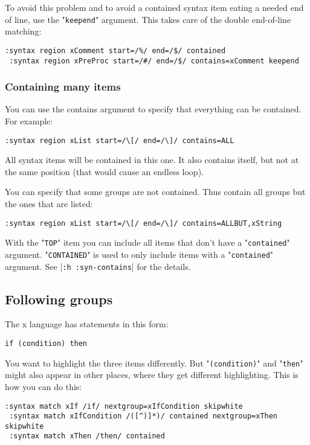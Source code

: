 To avoid this problem and to avoid a contained syntax item eating a needed end of line, use the "\texttt{keepend}" argument.
This takes care of the double end-of-line matching:

\begin{Verbatim}[samepage=true]
 :syntax region xComment start=/%/ end=/$/ contained
 :syntax region xPreProc start=/#/ end=/$/ contains=xComment keepend
\end{Verbatim}

\subsubsection{Containing many items}
You can use the contains argument to specify that everything can be contained.
For example:

\begin{Verbatim}[samepage=true]
 :syntax region xList start=/\[/ end=/\]/ contains=ALL
\end{Verbatim}

All syntax items will be contained in this one.
It also contains itself, but not at the same position (that would cause an endless loop).

You can specify that some groups are not contained.
Thus contain all groups but the ones that are listed:

\begin{Verbatim}[samepage=true]
 :syntax region xList start=/\[/ end=/\]/ contains=ALLBUT,xString
\end{Verbatim}

With the "\texttt{TOP}" item you can include all items that don't have a "\texttt{contained}" argument.
"\texttt{CONTAINED}" is used to only include items with a "\texttt{contained}" argument.
See |\texttt{:h :syn-contains}| for the details.
\subsection{Following groups}
The x language has statements in this form:

\begin{Verbatim}[samepage=true]
    if (condition) then 
\end{Verbatim}

You want to highlight the three items differently.
But "\texttt{(condition)}" and "\texttt{then}" might also appear in other places, where they get different highlighting.
This is how you can do this:

\begin{Verbatim}[samepage=true]
 :syntax match xIf /if/ nextgroup=xIfCondition skipwhite
 :syntax match xIfCondition /([^)]*)/ contained nextgroup=xThen skipwhite
 :syntax match xThen /then/ contained
\end{Verbatim}

